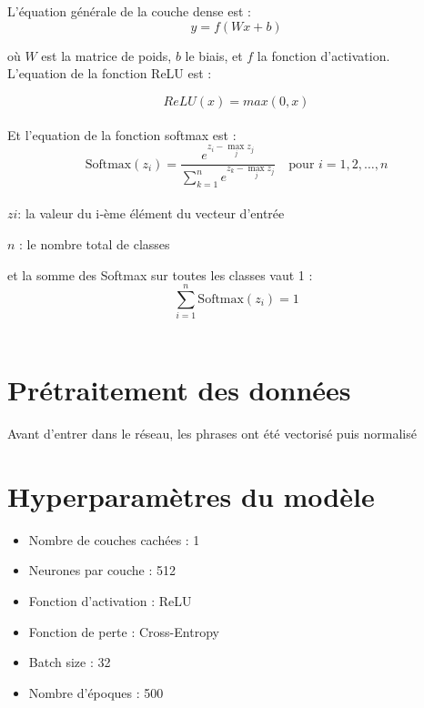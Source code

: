 \documentclass[a4paper,12pt]{report}
\begin{document}
L'équation générale de la couche dense est :
\[
	y = f(Wx + b)
\]

où $W$ est la matrice de poids, $b$ le biais, et $f$ la fonction d'activation.\\

L'equation de la fonction ReLU est :

\[
	ReLU(x)=max(0,x)
\]\\

Et l'equation de la fonction softmax est :\\

\[
\text{Softmax}(z_i) = \frac{e^{z_i - \max_j z_j}}{\sum_{k=1}^{n} e^{z_k - \max_j z_j}} \quad \text{pour } i = 1, 2, \dots, n
\]\\

$zi$: la valeur du i‑ème élément du vecteur d’entrée

$n$ : le nombre total de classes

et la somme des Softmax sur toutes les classes vaut 1 :
\[
\sum_{i=1}^{n} \text{Softmax}(z_i) = 1
\]\\

\section{Prétraitement des données}
Avant d'entrer dans le réseau, les phrases ont été vectorisé puis normalisé

\section{Hyperparamètres du modèle}
\begin{itemize}
    \item Nombre de couches cachées : 1
    \item Neurones par couche : 512
    \item Fonction d'activation : ReLU
    \item Fonction de perte : Cross-Entropy
    \item Batch size : 32
    \item Nombre d'époques : 500
\end{itemize}






\end{document}
